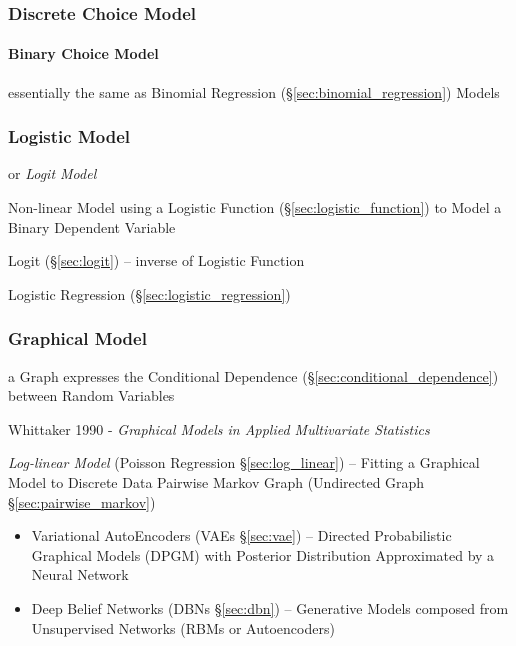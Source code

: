 \subsubsection{Discrete Choice Model}\label{sec:discrete_choice_model}

\paragraph{Binary Choice Model}\label{sec:binary_choice}\hfill

essentially the same as Binomial Regression
(\S\ref{sec:binomial_regression}) Models



\subsubsection{Logistic Model}\label{sec:logistic_model}

or \emph{Logit Model}

Non-linear Model using a Logistic Function (\S\ref{sec:logistic_function}) to
Model a Binary Dependent Variable

Logit (\S\ref{sec:logit}) -- inverse of Logistic Function

Logistic Regression (\S\ref{sec:logistic_regression})



\subsubsection{Graphical Model}\label{sec:graphical_model}

a Graph expresses the Conditional Dependence
(\S\ref{sec:conditional_dependence}) between Random Variables

Whittaker 1990 - \emph{Graphical Models in Applied Multivariate Statistics}

\fist \emph{Log-linear Model} (Poisson Regression \S\ref{sec:log_linear}) --
Fitting a Graphical Model to Discrete Data \fist Pairwise Markov Graph
(Undirected Graph \S\ref{sec:pairwise_markov})

\begin{itemize}
  \item Variational AutoEncoders (VAEs \S\ref{sec:vae}) -- Directed
    Probabilistic Graphical Models (DPGM) with Posterior Distribution
    Approximated by a Neural Network
  \item Deep Belief Networks (DBNs \S\ref{sec:dbn}) -- Generative Models
    composed from Unsupervised Networks (RBMs or Autoencoders)
\end{itemize}



